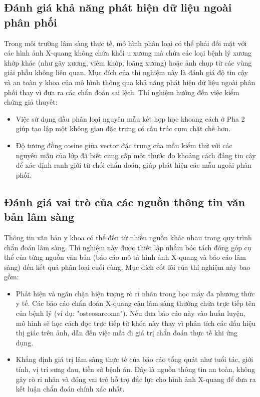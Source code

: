 \subsection{Đánh giá khả năng phát hiện dữ liệu ngoài phân phối}
Trong môi trường lâm sàng thực tế, mô hình phân loại có thể phải đối mặt với các hình ảnh X-quang không chứa khối u xương mà chứa các loại bệnh lý xương khớp khác (như gãy xương, viêm khớp, loãng xương) hoặc ảnh chụp từ các vùng giải phẫu không liên quan. Mục đích của thí nghiệm này là đánh giá độ tin cậy và an toàn y khoa của mô hình thông qua khả năng phát hiện dữ liệu ngoài phân phối thay vì đưa ra các chẩn đoán sai lệch. Thí nghiệm hướng đến việc kiểm chứng giả thuyết:
\begin{itemize}
    \item Việc sử dụng đầu phân loại nguyên mẫu kết hợp học khoảng cách ở Pha 2 giúp tạo lập một không gian đặc trưng có cấu trúc cụm chặt chẽ hơn.
    \item Độ tương đồng cosine giữa vector đặc trưng của mẫu kiểm thử với các nguyên mẫu của lớp đã biết cung cấp một thước đo khoảng cách đáng tin cậy để xác định ranh giới từ chối chẩn đoán, giúp phát hiện các mẫu ngoài phân phối.
\end{itemize}

\subsection{Đánh giá vai trò của các nguồn thông tin văn bản lâm sàng}
Thông tin văn bản y khoa có thể đến từ nhiều nguồn khác nhau trong quy trình chẩn đoán lâm sàng. Thí nghiệm này được thiết lập nhằm bóc tách đóng góp cụ thể của từng nguồn văn bản (báo cáo mô tả hình ảnh X-quang và báo cáo lâm sàng) đến kết quả phân loại cuối cùng. Mục đích cốt lõi của thí nghiệm này bao gồm:
\begin{itemize}
    \item Phát hiện và ngăn chặn hiện tượng rò rỉ nhãn trong học máy đa phương thức y tế. Các báo cáo chẩn đoán X-quang cận lâm sàng thường chứa trực tiếp tên của bệnh lý (ví dụ: "osteosarcoma"). Nếu đưa báo cáo này vào huấn luyện, mô hình sẽ học cách đọc trực tiếp từ khóa này thay vì phân tích các dấu hiệu thị giác trên ảnh, dẫn đến việc mất đi giá trị chẩn đoán thực tế khi ứng dụng.
    \item Khẳng định giá trị lâm sàng thực tế của báo cáo tổng quát như tuổi tác, giới tính, vị trí sưng đau, tiền sử bệnh án. Đây là nguồn thông tin an toàn, không gây rò rỉ nhãn và đóng vai trò hỗ trợ đắc lực cho hình ảnh X-quang để đưa ra kết luận chẩn đoán chính xác nhất.
\end{itemize}


